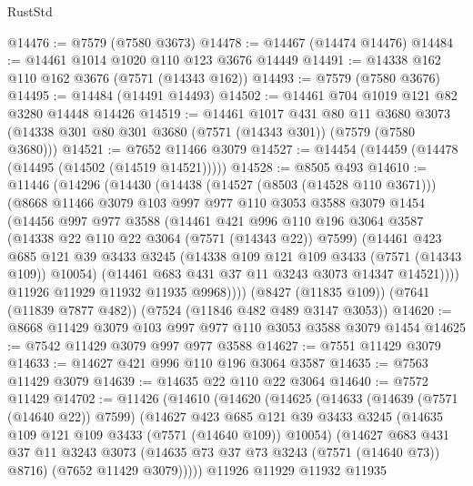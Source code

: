 \begin{lexlean}{RustStd}
\begin{coremodule}
@14476 := @7579 (@7580 @3673)
@14478 := @14467 (@14474 @14476)
@14484 := @14461 @1014 @1020 @110 @123 @3676 @14449
@14491 := @14338 @162 @110 @162 @3676 (@7571 (@14343 @162))
@14493 := @7579 (@7580 @3676)
@14495 := @14484 (@14491 @14493)
@14502 := @14461 @704 @1019 @121 @82 @3280 @14448 @14426
@14519 := @14461
    @1017
    @431
    @80
    @11
    @3680
    @3073
    (@14338 @301 @80 @301 @3680 (@7571 (@14343 @301)) (@7579 (@7580 @3680)))
@14521 := @7652 @11466 @3079
@14527 := @14454 (@14459 (@14478 (@14495 (@14502 (@14519 @14521)))))
@14528 := @8505 @493
@14610 := @11446
    (@14296
      (@14430
        (@14438
          (@14527 (@8503 (@14528 @110 @3671)))
          (@8668
            @11466
            @3079
            @103
            @997
            @977
            @110
            @3053
            @3588
            @3079
            @1454
            (@14456
              @997
              @977
              @3588
              (@14461
                @421
                @996
                @110
                @196
                @3064
                @3587
                (@14338 @22 @110 @22 @3064 (@7571 (@14343 @22)) @7599)
                (@14461
                  @423
                  @685
                  @121
                  @39
                  @3433
                  @3245
                  (@14338 @109 @121 @109 @3433 (@7571 (@14343 @109)) @10054)
                  (@14461 @683 @431 @37 @11 @3243 @3073 @14347 @14521))))
            @11926
            @11929
            @11932
            @11935
            @9968))))
    (@8427 (@11835 @109))
    (@7641 (@11839 @7877 @482))
    (@7524 (@11846 @482 @489 @3147 @3053))
@14620 := @8668 @11429 @3079 @103 @997 @977 @110 @3053 @3588 @3079 @1454
@14625 := @7542 @11429 @3079 @997 @977 @3588
@14627 := @7551 @11429 @3079
@14633 := @14627 @421 @996 @110 @196 @3064 @3587
@14635 := @7563 @11429 @3079
@14639 := @14635 @22 @110 @22 @3064
@14640 := @7572 @11429
@14702 := @11426
    (@14610
      (@14620
        (@14625
          (@14633
            (@14639 (@7571 (@14640 @22)) @7599)
            (@14627
              @423
              @685
              @121
              @39
              @3433
              @3245
              (@14635 @109 @121 @109 @3433 (@7571 (@14640 @109)) @10054)
              (@14627
                @683
                @431
                @37
                @11
                @3243
                @3073
                (@14635 @73 @37 @73 @3243 (@7571 (@14640 @73)) @8716)
                (@7652 @11429 @3079)))))
        @11926
        @11929
        @11932
        @11935

\end{coremodule}
\end{lexlean}
